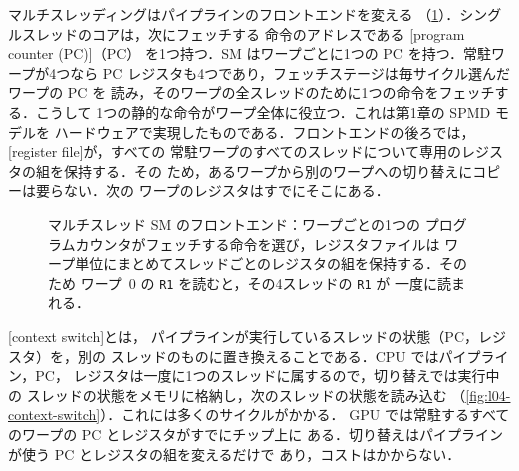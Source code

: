 \documentclass[../main.tex]{subfiles}
\begin{document}
マルチスレッディングはパイプラインのフロントエンドを変える
（\cref{fig:l04-warp-state}）．シングルスレッドのコアは，次にフェッチする
命令のアドレスである
[program counter (PC)]（PC）
を1つ持つ．SM はワープごとに1つの PC を持つ．常駐ワープが4つなら PC
レジスタも4つであり，フェッチステージは毎サイクル選んだワープの PC を
読み，そのワープの全スレッドのために1つの命令をフェッチする．こうして
1つの静的な命令がワープ全体に役立つ．これは第1章の SPMD モデルを
ハードウェアで実現したものである．フロントエンドの後ろでは，
[register file]が，すべての
常駐ワープのすべてのスレッドについて専用のレジスタの組を保持する．その
ため，あるワープから別のワープへの切り替えにコピーは要らない．次の
ワープのレジスタはすでにそこにある．

\begin{figure}[htbp]
  \centering
  
  \caption{マルチスレッド SM のフロントエンド：ワープごとの1つの
    プログラムカウンタがフェッチする命令を選び，レジスタファイルは
    ワープ単位にまとめてスレッドごとのレジスタの組を保持する．そのため
    ワープ~0 の \texttt{R1} を読むと，その4スレッドの \texttt{R1} が
    一度に読まれる．}
  \label{fig:l04-warp-state}
\end{figure}

\begin{definition}[コンテキストスイッチ]
  \label{def:l04-context-switch}
  [context switch]とは，
  パイプラインが実行しているスレッドの状態（PC，レジスタ）を，別の
  スレッドのものに置き換えることである．CPU ではパイプライン，PC，
  レジスタは一度に1つのスレッドに属するので，切り替えでは実行中の
  スレッドの状態をメモリに格納し，次のスレッドの状態を読み込む
  （\cref{fig:l04-context-switch}）．これには多くのサイクルがかかる．
  GPU では常駐するすべてのワープの PC とレジスタがすでにチップ上に
  ある．切り替えはパイプラインが使う PC とレジスタの組を変えるだけで
  あり，コストはかからない．
\end{definition}
\end{document}
